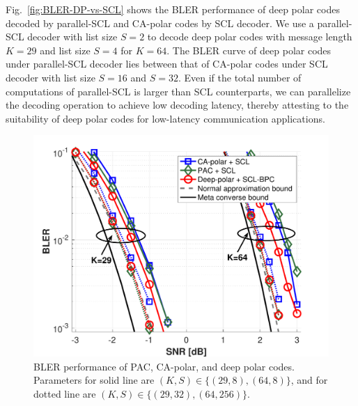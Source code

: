 \documentclass[conference]{IEEEtran}
\begin{document}
Fig.~\ref{fig:BLER-DP-vs-SCL} shows the BLER performance of deep polar codes decoded by parallel-SCL and CA-polar codes by SCL decoder. We use a parallel-SCL decoder with list size $S=2$ to decode deep polar codes with message length $K=29$ and list size $S=4$ for $K=64$. The BLER curve of deep polar codes under parallel-SCL decoder lies between that of CA-polar codes under SCL decoder with list size $S=16$ and $S=32$. Even if the total number of computations of parallel-SCL is larger than SCL counterparts, we can parallelize the decoding operation to achieve low decoding latency, thereby attesting to the suitability of deep polar codes for low-latency communication applications.




\begin{figure}[t]
\centering
\includegraphics[width=1.1\columnwidth]{BLER_PAC_3.pdf}
\caption{BLER performance of PAC, CA-polar, and deep polar codes. Parameters for solid line are $(K,S) \in \{(29,8), (64,8)\}$, and for dotted line are $(K,S)\in \{(29,32), (64,256)\}$.}
\label{fig:BLER-PAC}
\end{figure}
\end{document}
